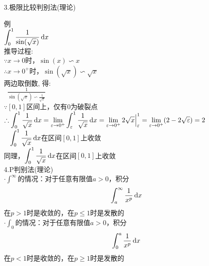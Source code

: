 3.极限比较判别法(理论)\\
\begin{center}
\end{center}

例\\
$\displaystyle\int_0^1\frac{1}{\sin(\sqrt{x})}\mathop{}\!\mathrm{d} x$\\
推导过程:\\
$\because x\to 0$时，$\sin(x)\backsim x$\\
$\therefore x\to 0^+$时，$\sin(\sqrt{x})\backsim\sqrt{x}$\\
\phantom{$\therefore$}两边取倒数, 得:\\
$\displaystyle\phantom{\therefore}\frac{1}{\sin(\sqrt{x})\backsim\frac{1}{\sqrt{x}}}$\\
$\because[0,1]$区间上，仅有$0$为破裂点\\
$\displaystyle\therefore\int_0^1\frac{1}{\sqrt{x}}\mathop{}\!\mathrm{d} x=\lim_{\varepsilon\to 0^+}\int_{\varepsilon}^1\frac{1}{\sqrt{x}}\mathop{}\!\mathrm{d} x=\lim_{\varepsilon\to 0^+}2\sqrt{x}\Big|_{\varepsilon}^1=\lim_{\varepsilon\to 0^+}(2-2\sqrt{\varepsilon})=2$\\
$\displaystyle\phantom{\therefore}\int_0^1\frac{1}{\sqrt{x}}\mathop{}\!\mathrm{d} x$在区间$[0,1]$上收敛\\
同理，$\displaystyle\int_0^1\frac{1}{\sqrt{x}}\mathop{}\!\mathrm{d} x$在区间$[0,1]$上收敛\\[4ex]

4.P判别法(理论)\\
$\displaystyle\cdot\int^{\infty}$的情况：对于任意有限值$a>0$，积分
\[\int_a^{\infty}\frac{1}{x^p}\mathop{}\!\mathrm{d} x\]
\phantom{$\cdot$}在$p>1$时是收敛的，在$p\leqslant 1$时是发散的\\
$\displaystyle\cdot\int_0$的情况：对于任意有限值$a>0$，积分
\[\int_0^a\frac{1}{x^p}\mathop{}\!\mathrm{d} x\]
\phantom{$\cdot$}在$p<1$时是收敛的，在$p\geqslant 1$时是发散的\\[4ex]

